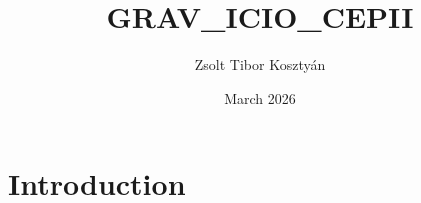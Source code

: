 \documentclass{article}
\title{GRAV_ICIO_CEPII}
\author{Zsolt Tibor Kosztyán}
\date{March 2026}
\begin{document}
\maketitle

\section{Introduction}
\end{document}
